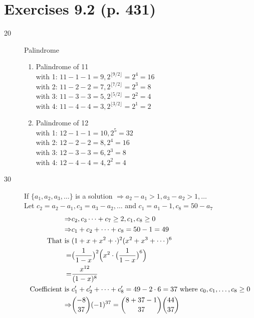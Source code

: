 \documentclass[a4paper]{article}
\begin{document}
\section*{Exercises 9.2 (p. 431) }
\begin{description}
\item[20] Palindrome
\begin{enumerate}[label=(\alph*)]
    \item Palindrome of 11\\
    with 1: $11-1-1=9, 2^{\lfloor9/2\rfloor}=2^4=16$\\
    with 2: $11-2-2=7, 2^{\lfloor7/2\rfloor}=2^3=8$\\
    with 3: $11-3-3=5, 2^{\lfloor5/2\rfloor}=2^2=4$\\
    with 4: $11-4-4=3, 2^{\lfloor3/2\rfloor}=2^1=2$
    \item Palindrome of 12\\
    with 1: $12-1-1=10, 2^5=32$\\
    with 2: $12-2-2=8, 2^4=16$\\
    with 3: $12-3-3=6, 2^3=8$\\
    with 4: $12-4-4=4, 2^2=4$
\end{enumerate}
\item [30]
If $\{a_1,a_2,a_3,\ldots\}$ is a solution $\Rightarrow a_2-a_1>1,a_3-a_2>1,\ldots$\\
Let $c_2=a_2-a_1, c_3=a_3-a_2, \ldots$ and $c_1=a_1-1, c_8=50-a_7$
\begin{align*}
    \Rightarrow&c_2,c_3\cdots+c_7\geq2, c_1,c_8\geq0\\
    \Rightarrow&c_1+c_2+\cdots+c_8=50-1=49\\
    \text{That is }&(1+x+x^2+\cdot)^2(x^2+x^3+\cdots)^6\\
    =&\bigl(\frac{1}{1-x}\bigr)^2\Bigl(x^2\cdot\bigl(\frac{1}{1-x}\bigr)^6\Bigr)\\
    =&\frac{x^{12}}{(1-x)^8}\\
    \text{Coefficient is }&c_1'+c_2'+\cdots+c_8'=49-2\cdot6=37\text{ where }c_0,c_1,\ldots,c_8\geq 0\\
    \Rightarrow&\binom{-8}{37}(-1)^{37}=\binom{8+37-1}{37}\binom{44}{37}
\end{align*}
\end{description}
\end{document}
